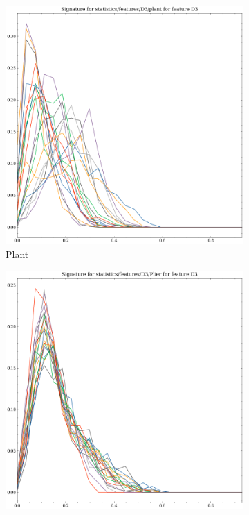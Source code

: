 \begin{figure}
    \centering
      \begin{subfigure}[b]{0.23\textwidth}
        \includegraphics[width=\textwidth]{assets/feature_extraction/D3/plant.png}
        \caption{Plant}
    \end{subfigure}
    \hfill
    \begin{subfigure}[b]{0.23\textwidth}
        \includegraphics[width=\textwidth]{assets/feature_extraction/D3/Plier.png}

\end{subfigure}
\end{figure}
